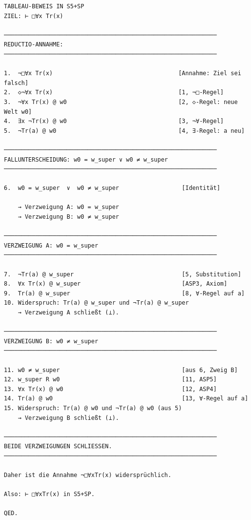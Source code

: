 \documentclass[
]{article}
\begin{document}
\begin{verbatim}
TABLEAU-BEWEIS IN S5+SP
ZIEL: ⊢ □∀x Tr(x)

─────────────────────────────────────────────────────────────
REDUCTIO-ANNAHME:
─────────────────────────────────────────────────────────────

1.  ¬□∀x Tr(x)                                    [Annahme: Ziel sei falsch]
2.  ◇¬∀x Tr(x)                                    [1, ¬□-Regel]
3.  ¬∀x Tr(x) @ w0                                [2, ◇-Regel: neue Welt w0]
4.  ∃x ¬Tr(x) @ w0                                [3, ¬∀-Regel]
5.  ¬Tr(a) @ w0                                   [4, ∃-Regel: a neu]

─────────────────────────────────────────────────────────────
FALLUNTERSCHEIDUNG: w0 = w_super ∨ w0 ≠ w_super
─────────────────────────────────────────────────────────────

6.  w0 = w_super  ∨  w0 ≠ w_super                  [Identität]

    → Verzweigung A: w0 = w_super
    → Verzweigung B: w0 ≠ w_super

─────────────────────────────────────────────────────────────
VERZWEIGUNG A: w0 = w_super
─────────────────────────────────────────────────────────────

7.  ¬Tr(a) @ w_super                               [5, Substitution]
8.  ∀x Tr(x) @ w_super                             [ASP3, Axiom]
9.  Tr(a) @ w_super                                [8, ∀-Regel auf a]
10. Widerspruch: Tr(a) @ w_super und ¬Tr(a) @ w_super
    → Verzweigung A schließt (⊥).

─────────────────────────────────────────────────────────────
VERZWEIGUNG B: w0 ≠ w_super
─────────────────────────────────────────────────────────────

11. w0 ≠ w_super                                   [aus 6, Zweig B]
12. w_super R w0                                   [11, ASP5]
13. ∀x Tr(x) @ w0                                  [12, ASP4]
14. Tr(a) @ w0                                     [13, ∀-Regel auf a]
15. Widerspruch: Tr(a) @ w0 und ¬Tr(a) @ w0 (aus 5)
    → Verzweigung B schließt (⊥).

─────────────────────────────────────────────────────────────
BEIDE VERZWEIGUNGEN SCHLIESSEN.
─────────────────────────────────────────────────────────────

Daher ist die Annahme ¬□∀xTr(x) widersprüchlich.

Also: ⊢ □∀xTr(x) in S5+SP.

QED.
\end{verbatim}
\end{document}
